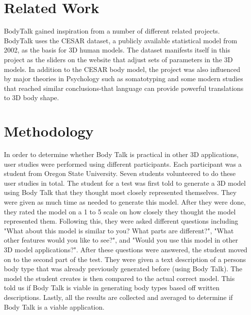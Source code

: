 \documentclass[journal]{vgtc}                %
\begin{document}
\section{Related Work}
BodyTalk gained inspiration from a number of different related projects. BodyTalk uses the CESAR dataset, a publicly available statistical model from 2002, as the basis for 3D human models. The dataset manifests itself in this project as the sliders on the website that adjust sets of parameters in the 3D models. In addition to the CESAR body model, the project was also influenced by major theories in Psychology such as somatotyping and some modern studies that reached similar conclusions-that language can provide powerful translations to 3D body shape.

\section{Methodology}
\noindent In order to determine whether Body Talk is practical in other 3D applications, user studies were performed using different participants. Each participant was a student from Oregon State University. Seven students volunteered to do these user studies in total. \newline \newline
\noindent The student for a test was first told to generate a 3D model using Body Talk that they thought most closely represented themselves. They were given as much time as needed to generate this model. After they were done, they rated the model on a 1 to 5 scale on how closely they thought the model represented them. Following this, they were asked different questions including "What about this model is similar to you? What parts are different?", "What other features would you like to see?", and "Would you use this model in other 3D model applications?".\newline \newline
\noindent After these questions were answered, the student moved on to the second part of the test. They were given a text description of a persons body type that was already previously generated before (using Body Talk). The model the student creates is then compared to the actual correct model. This told us if Body Talk is viable in generating body types based off written descriptions. \newline\newline
\noindent Lastly, all the results are collected and averaged to determine if Body Talk is a viable application.  
\end{document}
